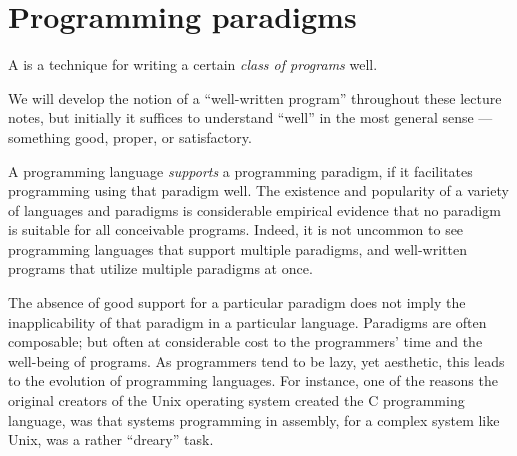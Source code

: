 \section{Programming paradigms}

\begin{definition}

A  is a technique for writing a certain \emph{class
of programs} well.

\end{definition}

We will develop the notion of a ``well-written program''
throughout these lecture notes, but initially it suffices to understand
``well'' in the most general sense --- something good, proper, or satisfactory.

A programming language \emph{supports} a programming paradigm, if it
facilitates programming using that paradigm well. The existence and popularity
of a variety of languages and paradigms is considerable empirical evidence that
no paradigm is suitable for all conceivable programs. Indeed, it is not
uncommon to see programming languages that support multiple paradigms, and
well-written programs that utilize multiple paradigms at once.

The absence of good support for a particular paradigm does not imply the
inapplicability of that paradigm in a particular language.  Paradigms are often
composable; but often at considerable cost to the programmers' time and the
well-being of programs. As programmers tend to be lazy, yet aesthetic, this
leads to the evolution of programming languages. For instance, one of the
reasons the original creators of the Unix\textsuperscript{\textregistered}
operating system created the C programming language, was that systems
programming in assembly, for a complex system like
Unix\textsuperscript{\textregistered}, was a rather ``dreary''
task\cite{the-development-of-c}.





